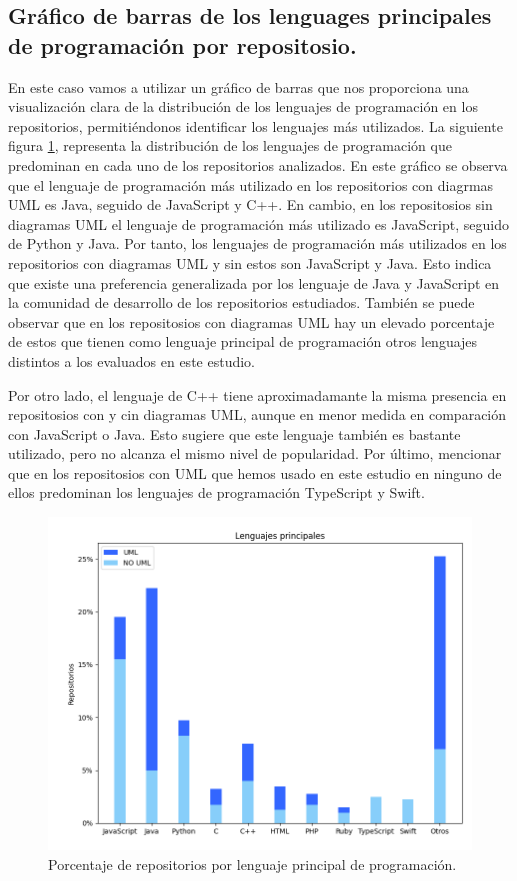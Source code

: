 \documentclass[a4paper, 12pt]{book}
\begin{document}
\subsection{Gráfico de barras de los lenguages principales de programación por repositosio.}
\label{sec:Gráfico de barras de los lenguages principales de programación por repositosio}

En este caso vamos a utilizar un gráfico de barras que nos proporciona una visualización clara de la distribución de los lenguajes de programación en los repositorios, permitiéndonos identificar los lenguajes más utilizados.
La siguiente figura \ref{fig:Figure_language}, representa la distribución de los lenguajes de programación que predominan en cada uno de los repositorios analizados.
En este gráfico se observa que el lenguaje de programación más utilizado en los repositorios con diagrmas UML es Java, seguido de JavaScript y C++.
En cambio, en los repositosios sin diagramas UML el lenguaje de programación más utilizado es JavaScript, seguido de Python y Java.
Por tanto, los lenguajes de programación más utilizados en los repositorios con diagramas UML y sin estos son JavaScript y Java. 
Esto indica que existe una preferencia generalizada por los lenguaje de Java y JavaScript en la comunidad de desarrollo de los repositorios estudiados.
También se puede observar que en los repositosios con diagramas UML hay un elevado porcentaje de estos que tienen como lenguaje principal de programación otros lenguajes distintos a los evaluados en este estudio.


Por otro lado, el lenguaje de C++ tiene aproximadamante la misma presencia en repositosios con y cin diagramas UML, aunque en menor medida en comparación con JavaScript o Java.
Esto sugiere que este lenguaje también es bastante utilizado, pero no alcanza el mismo nivel de popularidad.
Por último, mencionar que en los repositosios con UML que hemos usado en este estudio en ninguno de ellos predominan los lenguajes de programación TypeScript y Swift.

\begin{figure}
  \centering
  \includegraphics[width=12cm, keepaspectratio]{img/Figure_languages.png}
  \caption{Porcentaje de repositorios por lenguaje principal de programación.}\label{fig:Figure_language}
\end{figure}
\end{document}
